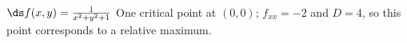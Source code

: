 {$\ds f(x,y) = \frac1{x^2+y^2+1}$
}
{
One critical point at $(0,0)$; $f_{xx} = -2$ and $D = 4$, so this point corresponds to a relative maximum.
}